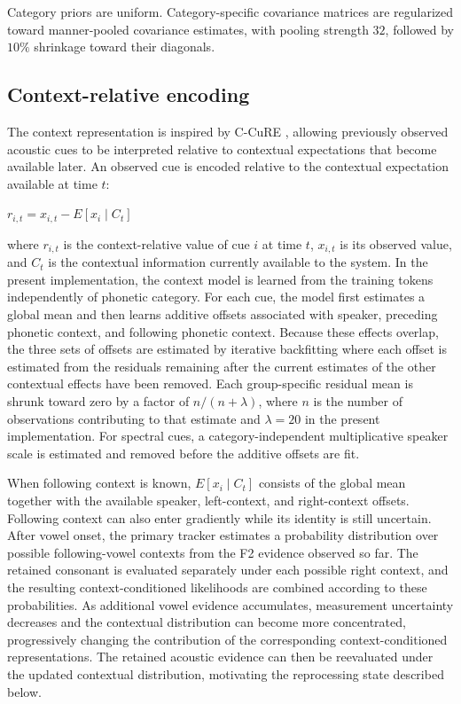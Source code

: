 \documentclass[12pt]{article}
\begin{document}
Category priors are uniform.
%
Category-specific covariance matrices are regularized toward manner-pooled covariance estimates, with pooling strength $32$, followed by $10\%$ shrinkage toward their diagonals.

\subsection{Context-relative encoding}

The context representation is inspired by C-CuRE \citep{McMurrayJongman2011}, allowing previously observed acoustic cues to be interpreted relative to contextual expectations that become available later.
%
An observed cue is encoded relative to the contextual expectation available at time $t$:
%
\begin{exe}
\ex $r_{i,t} = x_{i,t} - E[x_i \mid C_t]$
\end{exe}
%
where $r_{i,t}$ is the context-relative value of cue $i$ at time $t$, $x_{i,t}$ is its observed value, and $C_t$ is the contextual information currently available to the system.
%
In the present implementation, the context model is learned from the training tokens independently of phonetic category.
%
For each cue, the model first estimates a global mean and then learns additive offsets associated with speaker, preceding phonetic context, and following phonetic context.
%
Because these effects overlap, the three sets of offsets are estimated by iterative backfitting where each offset is estimated from the residuals remaining after the current estimates of the other contextual effects have been removed.
%
Each group-specific residual mean is shrunk toward zero by a factor of $n/(n+\lambda)$, where $n$ is the number of observations contributing to that estimate and $\lambda=20$ in the present implementation.
%
For spectral cues, a category-independent multiplicative speaker scale is estimated and removed before the additive offsets are fit.

When following context is known, $E[x_i \mid C_t]$ consists of the global mean together with the available speaker, left-context, and right-context offsets.
%
Following context can also enter gradiently while its identity is still uncertain.
%
After vowel onset, the primary tracker estimates a probability distribution over possible following-vowel contexts from the F2 evidence observed so far.
%
The retained consonant is evaluated separately under each possible right context, and the resulting context-conditioned likelihoods are combined according to these probabilities.
%
As additional vowel evidence accumulates, measurement uncertainty decreases and the contextual distribution can become more concentrated, progressively changing the contribution of the corresponding context-conditioned representations.
%
The retained acoustic evidence can then be reevaluated under the updated contextual distribution, motivating the reprocessing state described below.
\end{document}

